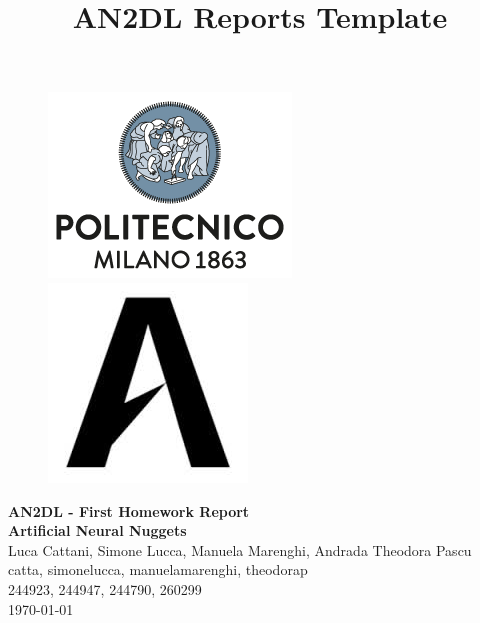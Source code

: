 \documentclass[11pt]{article}
\title{AN2DL Reports Template}
\begin{document}
    
    \begin{figure}[H]
        \raggedright
        \includegraphics[scale=0.4]{polimi.png} \hfill \includegraphics[scale=0.3]{airlab.jpeg}
    \end{figure}

  
    \vspace{5mm}
    
    \begin{center}
        {\Large \textbf{AN2DL - First Homework Report}}\\
        \vspace{2mm}
        {\Large \textbf{Artificial Neural Nuggets}}\\
        \vspace{2mm}
        {\large Luca Cattani,}
        {\large Simone Lucca,}
        {\large Manuela Marenghi,}
        {\large Andrada Theodora Pascu}\\
        \vspace{2mm}
        {catta,}
        {simonelucca,}
        {manuelamarenghi,}
        {theodorap}\\
        \vspace{2mm}
        {244923,}
        {244947,}
        {244790,}
        {260299}\\
        \vspace{5mm}
        \today
    \end{center}    
    \vspace{5mm}
    
\end{document}
